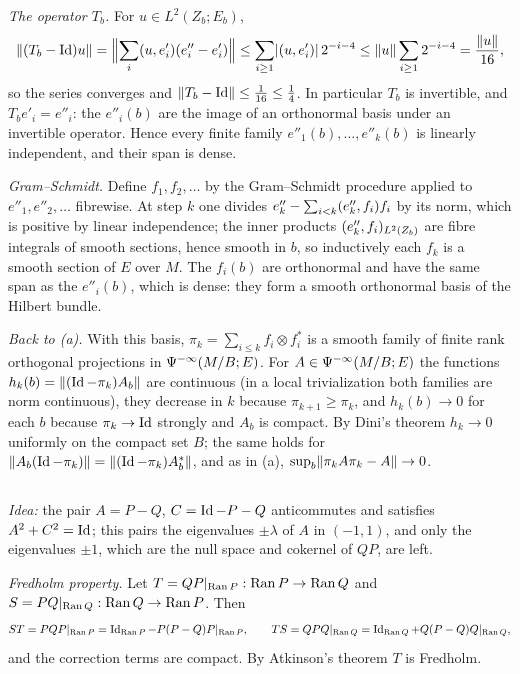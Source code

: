 \emph{The operator $T_b$.} For $u\in L^2(Z_b;E_b)$,
\begin{equation*}
  \lVert (T_b-\operatorname{Id})u\rVert=\Bigl\|\sum_i( u, e'_i)(e''_i-e'_i)\Bigr\|
  \le\sum_{i\ge1}\lvert ( u, e'_i)\rvert\,2^{-i-4}\le\lVert u\rVert\sum_{i\ge1}2^{-i-4}
  =\frac{\lVert u\rVert}{16},
\end{equation*}
so the series converges and $\lVert T_b-\operatorname{Id}\rVert\le\frac1{16}\le\frac14$. In
particular $T_b$ is invertible, and $T_be'_i=e''_i$: the $e''_i(b)$ are the image of
an orthonormal basis under an invertible operator. Hence every finite family
$e''_1(b),\dots,e''_k(b)$ is linearly independent, and their span is dense.

\emph{Gram--Schmidt.} Define $f_1,f_2,\dots$ by the Gram--Schmidt procedure applied
to $e''_1,e''_2,\dots$ fibrewise. At step $k$ one divides
$e''_k-\sum_{i<k}( e''_k, f_i)f_i$ by its norm, which is positive by linear
independence; the inner products $( e''_k, f_i)_{L^2(Z_b)}$ are fibre
integrals of smooth sections, hence smooth in $b$, so inductively each $f_k$ is a
smooth section of $E$ over $M$. The $f_i(b)$ are orthonormal and have the same span
as the $e''_i(b)$, which is dense: they form a smooth orthonormal basis of the
Hilbert bundle.

\emph{Back to (a).} With this basis, $\pi_k=\sum_{i\le k}f_i\otimes f_i^*$ is a smooth
family of finite rank orthogonal projections in $\Psi^{-\infty}(M/B;E)$. For
$A\in\Psi^{-\infty}(M/B;E)$ the functions $h_k(b)=\lVert (\operatorname{Id}-\pi_k)A_b\rVert$ are
continuous (in a local trivialization both families are norm continuous), they
decrease in $k$ because $\pi_{k+1}\ge\pi_k$, and $h_k(b)\to0$ for each $b$ because
$\pi_k\to\operatorname{Id}$ strongly and $A_b$ is compact. By Dini's theorem $h_k\to0$ uniformly
on the compact set $B$; the same holds for $\lVert A_b(\operatorname{Id}-\pi_k)\rVert=
\lVert (\operatorname{Id}-\pi_k)A_b^*\rVert$, and as in (a), $\sup_b\lVert \pi_kA\pi_k-A\rVert\to0$.

\subsection*{}

\emph{Idea:} the pair $A=P-Q$, $C=\operatorname{Id}-P-Q$ anticommutes and satisfies
$A^2+C^2=\operatorname{Id}$; this pairs the eigenvalues $\pm\lambda$ of $A$ in $(-1,1)$, and only
the eigenvalues $\pm1$, which are the null space and cokernel of $QP$, are left.

\emph{Fredholm property.} Let $T=QP|_{\operatorname{Ran} P}:\operatorname{Ran} P\to\operatorname{Ran} Q$ and
$S=PQ|_{\operatorname{Ran} Q}:\operatorname{Ran} Q\to\operatorname{Ran} P$. Then
\begin{equation*}
  ST=PQP|_{\operatorname{Ran} P}=\operatorname{Id}_{\operatorname{Ran} P}-P(P-Q)P|_{\operatorname{Ran} P},\qquad
  TS=QPQ|_{\operatorname{Ran} Q}=\operatorname{Id}_{\operatorname{Ran} Q}+Q(P-Q)Q|_{\operatorname{Ran} Q},
\end{equation*}
and the correction terms are compact. By Atkinson's theorem $T$ is Fredholm.

